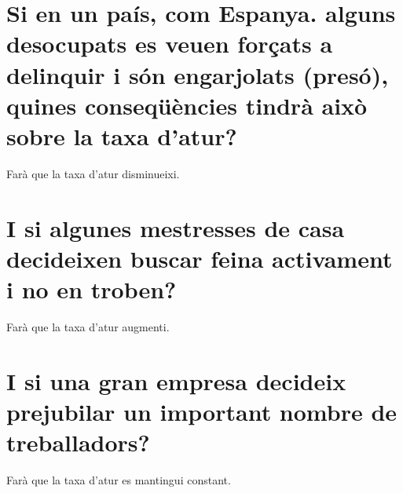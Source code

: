 \section{
  Si en un país, com Espanya. alguns desocupats es veuen forçats a
  delinquir i són engarjolats (presó), quines conseqüències tindrà 
  això sobre la taxa d'atur?
}

Farà que la taxa d'atur disminueixi.

\section*{
  I si algunes mestresses de casa decideixen buscar feina activament i no en
  troben?
}

Farà que la taxa d'atur augmenti.

\section*{
  I si una gran empresa decideix prejubilar un important nombre de
  treballadors?
}

Farà que la taxa d'atur es mantingui constant.
